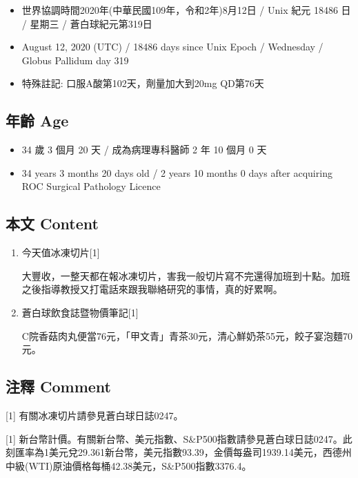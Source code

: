 \documentclass[
]{article}
\providecommand{\tightlist}{%
  \setlength{\itemsep}{0pt}\setlength{\parskip}{0pt}}
\begin{document}
\begin{itemize}
\tightlist
\item
  世界協調時間2020年(中華民國109年，令和2年)8月12日 / Unix 紀元 18486 日
  / 星期三 / 蒼白球紀元第319日
\item
  August 12, 2020 (UTC) / 18486 days since Unix Epoch / Wednesday /
  Globus Pallidum day 319
\item
  特殊註記: 口服A酸第102天，劑量加大到20mg QD第76天
\end{itemize}

\hypertarget{ux5e74ux9f61-age-11}{%
\subsection{年齡 Age}\label{ux5e74ux9f61-age-11}}

\begin{itemize}
\tightlist
\item
  34 歲 3 個月 20 天 / 成為病理專科醫師 2 年 10 個月 0 天
\item
  34 years 3 months 20 days old / 2 years 10 months 0 days after
  acquiring ROC Surgical Pathology Licence
\end{itemize}

\hypertarget{ux672cux6587-content-11}{%
\subsection{本文 Content}\label{ux672cux6587-content-11}}

\begin{enumerate}
\def\labelenumi{\arabic{enumi}.}
\item
  今天值冰凍切片{[}1{]}

  大豐收，一整天都在報冰凍切片，害我一般切片寫不完還得加班到十點。加班之後指導教授又打電話來跟我聯絡研究的事情，真的好累啊。
\item
  蒼白球飲食誌暨物價筆記{[}1{]}

  C院香菇肉丸便當76元，「甲文青」青茶30元，清心鮮奶茶55元，餃子宴泡麵70元。
\end{enumerate}

\hypertarget{ux6ce8ux91cb-comment-11}{%
\subsection{注釋 Comment}\label{ux6ce8ux91cb-comment-11}}

{[}1{]} 有關冰凍切片請參見蒼白球日誌0247。

{[}1{]}
新台幣計價。有關新台幣、美元指數、S\&P500指數請參見蒼白球日誌0247。此刻匯率為1美元兌29.361新台幣，美元指數93.39，金價每盎司1939.14美元，西德州中級(WTI)原油價格每桶42.38美元，S\&P500指數3376.4。
\end{document}
